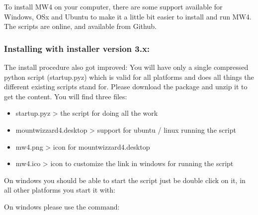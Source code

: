 \documentclass[a4paper,10pt,english]{sphinxmanual}
\begin{document}
\sphinxAtStartPar
To install MW4 on your computer, there are some support available for Windows, OSx
and Ubuntu to make it a little bit easier to install and run MW4. The scripts are
online, and available from Github.


\subsubsection{Installing with installer version 3.x:}
\label{\detokenize{install/mw4:installing-with-installer-version-3-x}}
\sphinxAtStartPar
The install procedure also got improved: You will have only a single compressed
python script (startup.pyz) which is valid for all platforms and does all things
the different existing scripts stand for. Please download the package and unzip it
to get the content. You will find three files:
\begin{itemize}
\item {} 
\sphinxAtStartPar
startup.pyz \sphinxhyphen{}\textgreater{} the script for doing all the work

\item {} 
\sphinxAtStartPar
mountwizzard4.desktop \sphinxhyphen{}\textgreater{} support for ubuntu / linux running the script

\item {} 
\sphinxAtStartPar
mw4.png \sphinxhyphen{}\textgreater{} icon for mountwizzard4.desktop

\item {} 
\sphinxAtStartPar
mw4.ico \sphinxhyphen{}\textgreater{} icon to customize the link in windows for running the script

\end{itemize}

\sphinxAtStartPar
{}

\sphinxAtStartPar
On windows you should be able to start the script just be double click on it,
in all other platforms you start it with:

\begin{sphinxVerbatim}[commandchars=\\\{\}]
 
\end{sphinxVerbatim}

\sphinxAtStartPar
On windows please use the command:

\begin{sphinxVerbatim}[commandchars=\\\{\}]
 
\end{sphinxVerbatim}
\end{document}

